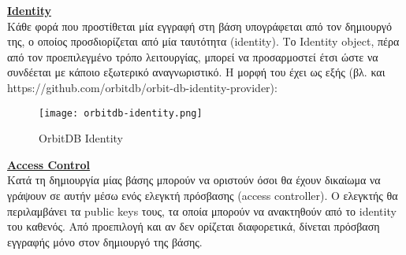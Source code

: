 \underline{\textbf{Identity}}\\
Κάθε φορά που προστίθεται μία εγγραφή στη βάση υπογράφεται από τον δημιουργό της, ο οποίος προσδιορίζεται από μία ταυτότητα (identity). Το Identity object, πέρα από τον προεπιλεγμένο τρόπο λειτουργίας, μπορεί να προσαρμοστεί έτσι ώστε να συνδέεται με κάποιο εξωτερικό αναγνωριστικό.
Η μορφή του έχει ως εξής (βλ. και https://github.com/orbitdb/orbit-db-identity-provider):

\begin{figure}[H]
	\centering
	\texttt{[image: orbitdb-identity.png]}
	\caption{OrbitDB Identity}
\end{figure}

\underline{\textbf{Access Control}}\\
Κατά τη δημιουργία μίας βάσης μπορούν να οριστούν όσοι θα έχουν δικαίωμα να γράψουν σε αυτήν μέσω ενός ελεγκτή πρόσβασης (access controller). Ο ελεγκτής θα περιλαμβάνει τα public keys τους, τα οποία μπορούν να ανακτηθούν από το identity του καθενός. Από προεπιλογή και αν δεν ορίζεται διαφορετικά, δίνεται πρόσβαση εγγραφής μόνο στον δημιουργό της βάσης.
